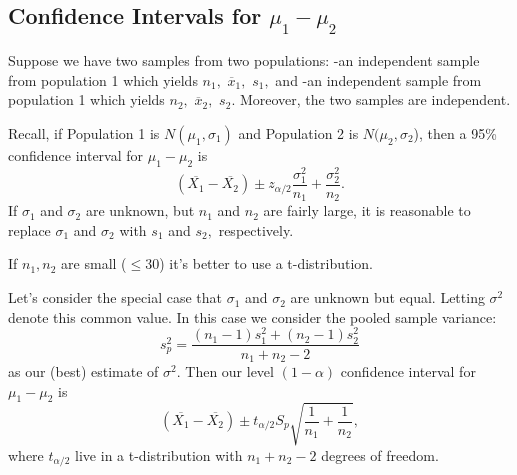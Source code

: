 \documentclass[
]{book}
\theoremstyle{definition}
\theoremstyle{definition}
\theoremstyle{definition}
\theoremstyle{definition}
\theoremstyle{remark}
\begin{document}
\subsection*{\texorpdfstring{Confidence Intervals for \(\mu_1-\mu_2\)}{Confidence Intervals for \textbackslash mu\_1-\textbackslash mu\_2}}\label{confidence-intervals-for-mu_1-mu_2}

Suppose we have two samples from two populations:
-an independent sample from population 1 which yields \(n_1,\) \(\overline{x}_1,\) \(s_1,\) and
-an independent sample from population 1 which yields \(n_2,\) \(\overline{x}_2,\) \(s_2\).
Moreover, the two samples are independent.

Recall, if Population 1 is \(N(\mu_1,\sigma_1)\) and Population 2 is \(N(\mu_2,\sigma_2\)), then a 95\% confidence interval for \(\mu_1-\mu_2\) is
\[\left(\overline{X_1}-\overline{X_2}\right)\pm z_{\alpha/2} \frac{\sigma_1^2}{n_1} + \frac{\sigma_2^2}{n_2}.\]
If \(\sigma_1\) and \(\sigma_2\) are unknown, but \(n_1\) and \(n_2\) are fairly large, it is reasonable to replace \(\sigma_1\) and \(\sigma_2\) with \(s_1\) and \(s_2,\) respectively.

If \(n_1, n_2\) are small (\(\leq 30\)) it's better to use a t-distribution.

Let's consider the special case that \(\sigma_1\) and \(\sigma_2\) are unknown but equal. Letting \(\sigma^2\) denote this common value. In this case we consider the pooled sample variance:
\[s_p^2 = \frac{(n_1-1)s_1^2 + (n_2-1)s_2^2}{n_1+n_2-2}\] as our (best) estimate of \(\sigma^2\). Then our level \((1-\alpha)\) confidence interval for \(\mu_1-\mu_2\) is \[\left(\overline{X_1}-\overline{X_2}\right)\pm t_{\alpha/2}S_p \sqrt{\frac{1}{n_1} + \frac{1}{n_2}},\]
where \(t_{\alpha/2}\) live in a t-distribution with \(n_1+n_2-2\) degrees of freedom.
\end{document}
